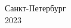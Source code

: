 \begin{titlepage}
\vfill %

\begin{center}
Санкт-Петербург\\
2023
\end{center}

\end{titlepage}

\setcounter{page}{2}